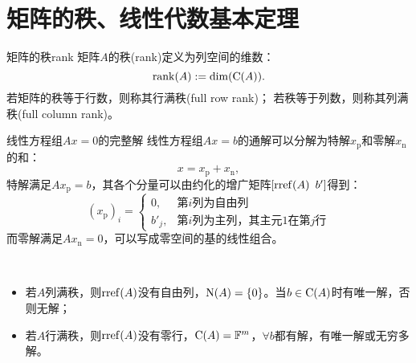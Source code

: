 \section{矩阵的秩、线性代数基本定理}
\begin{definition}{矩阵的秩}{rank}
	矩阵$A$的秩(rank)定义为列空间的维数：%
	\[
		\operatorname{rank}(A):=\dim(\operatorname{C}(A)).
	\]
	若矩阵的秩等于行数，则称其行满秩(full row rank)；
	若秩等于列数，则称其列满秩(full column rank)。
\end{definition}
\begin{theorem}
	{线性方程组$Ax=0$的完整解}{}
	线性方程组$Ax=b$的通解可以分解为特解$x_{\mathrm p}$和零解$x_{\mathrm n}$的和：
	\[
		x=x_{\mathrm p}+x_{\mathrm n},
	\]
	特解满足$Ax_{\mathrm p}=b$，其各个分量可以由约化的增广矩阵$[\operatorname{rref}(A)\enspace b']$得到：
	\[
		(x_{\mathrm p})_i=\begin{cases}
			0,&\text{第$i$列为自由列}\\
			b'_j,&\text{第$i$列为主列，其主元1在第$j$行}
		\end{cases}
	\]
	而零解满足$Ax_{\mathrm n}=0$，可以写成零空间的基的线性组合。
\end{theorem}
\begin{corollary}
	~
	\begin{itemize}
		\item 若$A$列满秩，则$\operatorname{rref}(A)$没有自由列，$\operatorname{N}(A)=\{0\}$。当$b\in\operatorname{C}(A)$时有唯一解，否则无解；
		\item 若$A$行满秩，则$\operatorname{rref}(A)$没有零行，$\operatorname{C}(A)=\mathbb F^m$，$\forall b$都有解，有唯一解或无穷多解。
	\end{itemize}
\end{corollary}
